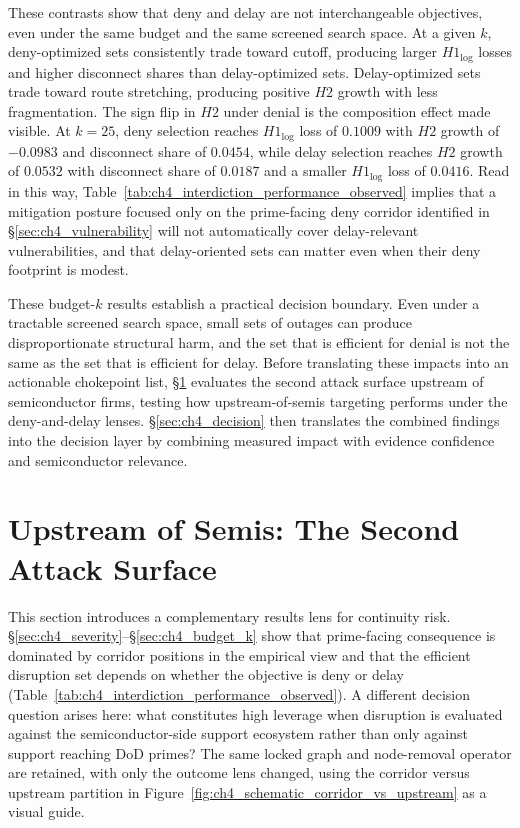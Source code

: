 These contrasts show that deny and delay are not interchangeable objectives, even under the same budget and the same screened search space. At a given $k$, deny-optimized sets consistently trade toward cutoff, producing larger $H1_{\log}$ losses and higher disconnect shares than delay-optimized sets. Delay-optimized sets trade toward route stretching, producing positive $H2$ growth with less fragmentation. The sign flip in $H2$ under denial is the composition effect made visible. At $k=25$, deny selection reaches $H1_{\log}$ loss of $0.1009$ with $H2$ growth of $-0.0983$ and disconnect share of $0.0454$, while delay selection reaches $H2$ growth of $0.0532$ with disconnect share of $0.0187$ and a smaller $H1_{\log}$ loss of $0.0416$. Read in this way, Table~\ref{tab:ch4_interdiction_performance_observed} implies that a mitigation posture focused only on the prime-facing deny corridor identified in \S\ref{sec:ch4_vulnerability} will not automatically cover delay-relevant vulnerabilities, and that delay-oriented sets can matter even when their deny footprint is modest.

These budget-$k$ results establish a practical decision boundary. Even under a tractable screened search space, small sets of outages can produce disproportionate structural harm, and the set that is efficient for denial is not the same as the set that is efficient for delay. Before translating these impacts into an actionable chokepoint list, \S\ref{sec:ch4_upstream} evaluates the second attack surface upstream of semiconductor firms, testing how upstream-of-semis targeting performs under the deny-and-delay lenses. \S\ref{sec:ch4_decision} then translates the combined findings into the decision layer by combining measured impact with evidence confidence and semiconductor relevance.

\section{Upstream of Semis: The Second Attack Surface}
\label{sec:ch4_upstream}

This section introduces a complementary results lens for continuity risk. \S\ref{sec:ch4_severity}--\S\ref{sec:ch4_budget_k} show that prime-facing consequence is dominated by corridor positions in the empirical view and that the efficient disruption set depends on whether the objective is deny or delay (Table~\ref{tab:ch4_interdiction_performance_observed}). A different decision question arises here: what constitutes high leverage when disruption is evaluated against the semiconductor-side support ecosystem rather than only against support reaching DoD primes? The same locked graph and node-removal operator are retained, with only the outcome lens changed, using the corridor versus upstream partition in Figure~\ref{fig:ch4_schematic_corridor_vs_upstream} as a visual guide.

